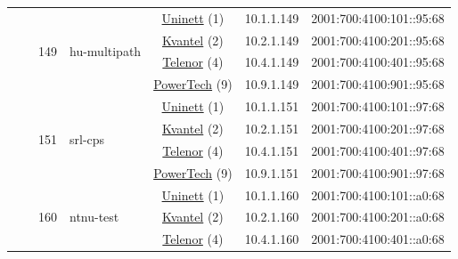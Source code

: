 \begin{small}
\begin{center}
\begin{longtable}{|c|c|c|c|c|c|c|c|}
  &  & \multirow{4}{*}{\tiny{149}} & \multicolumn{1}{|l|}{\multirow{4}{*}{\tiny{hu-multipath}}} & \multicolumn{2}{|c|}{\tiny{\href{https://www.uninett.no}{Uninett} (1)}} & \tiny{10.1.1.149} & \tiny{2001:700:4100:101::95:68} \\* \cline{5-5}\cline{6-6}\cline{7-7}\cline{8-8}
  &  &  &  & \multicolumn{2}{|c|}{\tiny{\href{http://kvantel.no}{Kvantel} (2)}} & \tiny{10.2.1.149} & \tiny{2001:700:4100:201::95:68} \\* \cline{5-5}\cline{6-6}\cline{7-7}\cline{8-8}
  &  &  &  & \multicolumn{2}{|c|}{\tiny{\href{https://www.telenor.no}{Telenor} (4)}} & \tiny{10.4.1.149} & \tiny{2001:700:4100:401::95:68} \\* \cline{5-5}\cline{6-6}\cline{7-7}\cline{8-8}
  &  &  &  & \multicolumn{2}{|c|}{\tiny{\href{http://www.powertech.no}{PowerTech} (9)}} & \tiny{10.9.1.149} & \tiny{2001:700:4100:901::95:68} \\* \cline{3-3}\cline{4-4}\cline{5-5}\cline{6-6}\cline{7-7}\cline{8-8}
  &  & \multirow{4}{*}{\tiny{151}} & \multicolumn{1}{|l|}{\multirow{4}{*}{\tiny{srl-cps}}} & \multicolumn{2}{|c|}{\tiny{\href{https://www.uninett.no}{Uninett} (1)}} & \tiny{10.1.1.151} & \tiny{2001:700:4100:101::97:68} \\* \cline{5-5}\cline{6-6}\cline{7-7}\cline{8-8}
  &  &  &  & \multicolumn{2}{|c|}{\tiny{\href{http://kvantel.no}{Kvantel} (2)}} & \tiny{10.2.1.151} & \tiny{2001:700:4100:201::97:68} \\* \cline{5-5}\cline{6-6}\cline{7-7}\cline{8-8}
  &  &  &  & \multicolumn{2}{|c|}{\tiny{\href{https://www.telenor.no}{Telenor} (4)}} & \tiny{10.4.1.151} & \tiny{2001:700:4100:401::97:68} \\* \cline{5-5}\cline{6-6}\cline{7-7}\cline{8-8}
  &  &  &  & \multicolumn{2}{|c|}{\tiny{\href{http://www.powertech.no}{PowerTech} (9)}} & \tiny{10.9.1.151} & \tiny{2001:700:4100:901::97:68} \\* \cline{3-3}\cline{4-4}\cline{5-5}\cline{6-6}\cline{7-7}\cline{8-8}
  &  & \multirow{4}{*}{\tiny{160}} & \multicolumn{1}{|l|}{\multirow{4}{*}{\tiny{ntnu-test}}} & \multicolumn{2}{|c|}{\tiny{\href{https://www.uninett.no}{Uninett} (1)}} & \tiny{10.1.1.160} & \tiny{2001:700:4100:101::a0:68} \\* \cline{5-5}\cline{6-6}\cline{7-7}\cline{8-8}
  &  &  &  & \multicolumn{2}{|c|}{\tiny{\href{http://kvantel.no}{Kvantel} (2)}} & \tiny{10.2.1.160} & \tiny{2001:700:4100:201::a0:68} \\* \cline{5-5}\cline{6-6}\cline{7-7}\cline{8-8}
  &  &  &  & \multicolumn{2}{|c|}{\tiny{\href{https://www.telenor.no}{Telenor} (4)}} & \tiny{10.4.1.160} & \tiny{2001:700:4100:401::a0:68} \\* \cline{5-5}\cline{6-6}\cline{7-7}\cline{8-8}

\end{longtable}
\end{center}
\end{small}
